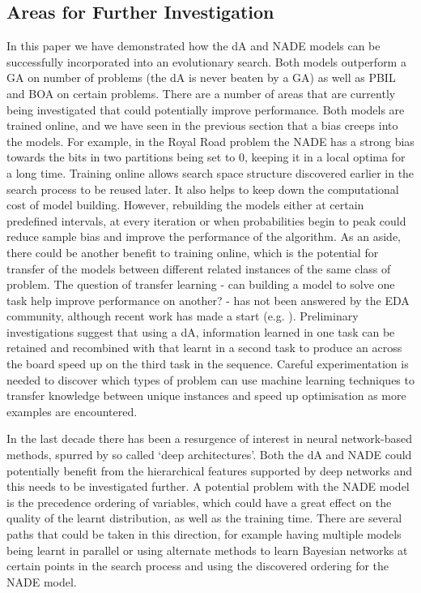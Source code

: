 \documentclass[twoside]{article}
\begin{document}
\subsection{Areas for Further Investigation}
In this paper we have demonstrated how the dA and NADE models can be successfully incorporated into an evolutionary search. Both models outperform a GA on number of problems (the dA is never beaten by a GA) as well as PBIL and BOA on certain problems. There are a number of areas that are currently being investigated that could potentially improve performance. Both models are trained online, and we have seen in the previous section that a bias creeps into the models. For example, in the Royal Road problem the NADE has a strong bias towards the bits in two partitions being set to 0, keeping it in a local optima for a long time. Training online allows search space structure discovered earlier in the search process to be reused later. It also helps to keep down the computational cost of model building. However, rebuilding the models either at certain predefined intervals, at every iteration or when probabilities begin to peak could reduce sample bias and improve the performance of the algorithm. As an aside, there could be another benefit to training online, which is the potential for transfer of the models between different related instances of the same class of problem. The question of transfer learning - can building a model to solve one task help improve performance on another? - has not been answered by the EDA community, although recent work has made a start (e.g. \cite{hauschild2012using}). Preliminary investigations suggest that using a dA, information learned in one task can be retained and recombined with that learnt in a second task to produce an across the board speed up on the third task in the sequence. Careful experimentation is needed to discover which types of problem can use machine learning techniques to transfer knowledge between unique instances and speed up optimisation as more examples are encountered.

In the last decade there has been a resurgence of interest in neural network-based methods, spurred by so called `deep architectures'. Both the dA and NADE could potentially benefit from the hierarchical features supported by deep networks and this needs to be investigated further. A potential problem with the NADE model is the precedence ordering of variables, which could have a great effect on the quality of the learnt distribution, as well as the training time. There are several paths that could be taken in this direction, for example having multiple models being learnt in parallel or using alternate methods to learn Bayesian networks at certain points in the search process and using the discovered ordering for the NADE model.
\end{document}
